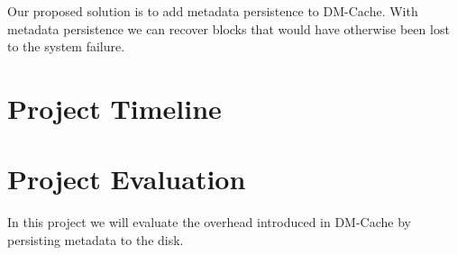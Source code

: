 \documentclass[letterpaper,12pt]{article}
\begin{document}
Our proposed solution is to add metadata persistence to DM-Cache. With
metadata persistence we can recover blocks that would have otherwise
been lost to the system failure.


\section*{Project Timeline}


\section*{Project Evaluation}

In this project we will evaluate the overhead introduced in DM-Cache
by persisting metadata to the disk.




\end{document}
